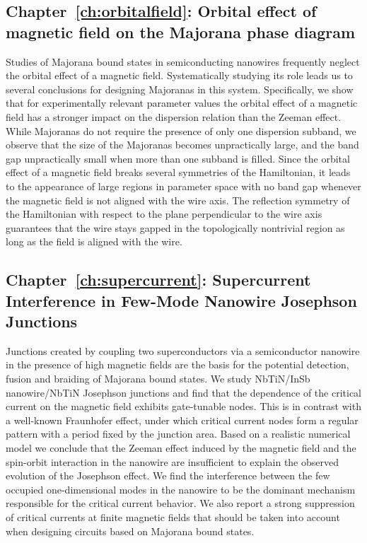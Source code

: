 \subsection{Chapter~\ref{ch:orbitalfield}: Orbital effect of magnetic field on the Majorana phase diagram}
Studies of Majorana bound states in semiconducting nanowires frequently neglect the orbital effect of a magnetic field.
Systematically studying its role leads us to several conclusions for designing Majoranas in this system.
Specifically, we show that for experimentally relevant parameter values the orbital effect of a magnetic field has a stronger impact on the dispersion relation than the Zeeman effect.
While Majoranas do not require the presence of only one dispersion subband, we observe that the size of the Majoranas becomes unpractically large, and the band gap unpractically small when more than one subband is filled.
Since the orbital effect of a magnetic field breaks several symmetries of the Hamiltonian, it leads to the appearance of large regions in parameter space with no band gap whenever the magnetic field is not aligned with the wire axis.
The reflection symmetry of the Hamiltonian with respect to the plane perpendicular to the wire axis guarantees that the wire stays gapped in the topologically nontrivial region as long as the field is aligned with the wire.
\vspace{1mm}

\subsection{Chapter~\ref{ch:supercurrent}: Supercurrent Interference in Few-Mode Nanowire Josephson Junctions}
Junctions created by coupling two superconductors via a semiconductor nanowire in the presence of high magnetic fields are the basis for the potential detection, fusion and braiding of Majorana bound states.
We study NbTiN/InSb nanowire/NbTiN Josephson junctions and find that the dependence of the critical current on the magnetic field exhibits gate-tunable nodes.
This is in contrast with a well-known Fraunhofer effect, under which critical current nodes form a regular pattern with a period fixed by the junction area.
Based on a realistic numerical model we conclude that the Zeeman effect induced by the magnetic field and the spin-orbit interaction in the nanowire are insufficient to explain the observed evolution of the Josephson effect.
We find the interference between the few occupied one-dimensional modes in the nanowire to be the dominant mechanism responsible for the critical current behavior.
We also report a strong suppression of critical currents at finite magnetic fields that should be taken into account when designing circuits based on Majorana bound states.
\vspace{1mm}


